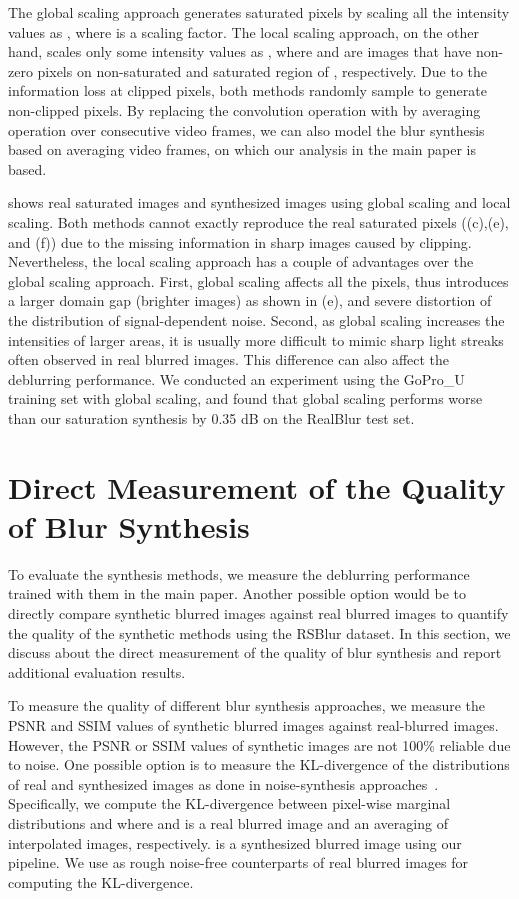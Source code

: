 The global scaling approach generates saturated pixels by scaling all the intensity values as , where  is a scaling factor. The local scaling approach, on the other hand, scales only some intensity values as , where  and  are images that have non-zero pixels on non-saturated and saturated region of , respectively.
Due to the information loss at clipped pixels, both methods randomly sample  to generate non-clipped pixels.
By replacing the convolution operation with  by averaging operation over consecutive video frames, we can also model the blur synthesis based on averaging video frames, on which our analysis in the main paper is based.

 shows real saturated images and synthesized images using global scaling and local scaling.
Both methods cannot exactly reproduce the real saturated pixels ((c),(e), and (f)) due to the missing information in sharp images caused by clipping. 
Nevertheless, the local scaling approach has a couple of advantages over the global scaling approach.
First, global scaling affects all the pixels, thus introduces a larger domain gap (brighter images) as shown in (e), and severe distortion of the distribution of signal-dependent noise.
Second, as global scaling increases the intensities of larger areas, it is usually more difficult to mimic sharp light streaks often observed in real blurred images.
This difference can also affect the deblurring performance.
We conducted an experiment using the GoPro\_U training set with global scaling, and found that global scaling performs worse than our saturation synthesis by 0.35 dB on the RealBlur test set.



\section{Direct Measurement of the Quality of Blur Synthesis}

To evaluate the synthesis methods, we measure the deblurring performance trained with them in the main paper.
Another possible option would be to directly compare synthetic blurred images against real blurred images to quantify the quality of the synthetic methods using the RSBlur dataset.
In this section, we discuss about the direct measurement of the quality of blur synthesis and report additional evaluation results.

To measure the quality of different blur synthesis approaches, we measure the PSNR and SSIM values of synthetic blurred images against real-blurred images.
However, the PSNR or SSIM values of synthetic images are not 100\% reliable due to noise.
One possible option is to measure the KL-divergence of the distributions of real and synthesized images as done in noise-synthesis approaches~\cite{Abdelhamed_2019_ICCV, Chang_2020_ECCV, Jang_2021_ICCV}.
Specifically, we compute the KL-divergence between pixel-wise marginal distributions  and  where  and  is a real blurred image and an averaging of interpolated images, respectively.  is a synthesized blurred image using our pipeline.
We use  as rough noise-free counterparts of real blurred images for computing the KL-divergence.

